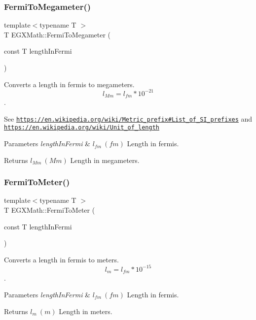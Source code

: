 \subsubsection{\texorpdfstring{Fermi\+To\+Megameter()}{FermiToMegameter()}}
{\footnotesize\ttfamily template$<$typename T $>$ \\
T E\+G\+X\+Math\+::\+Fermi\+To\+Megameter (\begin{DoxyParamCaption}\item[{const T}]{length\+In\+Fermi }\end{DoxyParamCaption})}



Converts a length in fermis to megameters. \[ l_{Mm}=l_{fm} * 10^{-21} \]. 

See \href{https://en.wikipedia.org/wiki/Metric_prefix#List_of_SI_prefixes}{\tt https\+://en.\+wikipedia.\+org/wiki/\+Metric\+\_\+prefix\#\+List\+\_\+of\+\_\+\+S\+I\+\_\+prefixes} and \href{https://en.wikipedia.org/wiki/Unit_of_length}{\tt https\+://en.\+wikipedia.\+org/wiki/\+Unit\+\_\+of\+\_\+length} 
\begin{DoxyParams}{Parameters}
{\em length\+In\+Fermi} & $ l_{fm}\ (fm)$ Length in fermis. \\
\hline
\end{DoxyParams}
\begin{DoxyReturn}{Returns}
$ l_{Mm}\ (Mm)$ Length in megameters. 
\end{DoxyReturn}
\mbox{\label{group___e_g_x_math-_conversions-_length_conversions-_non-_s_i-_fermi-_s_i_ga4b46bec209c12abbb998b2301d273d28}} 
\subsubsection{\texorpdfstring{Fermi\+To\+Meter()}{FermiToMeter()}}
{\footnotesize\ttfamily template$<$typename T $>$ \\
T E\+G\+X\+Math\+::\+Fermi\+To\+Meter (\begin{DoxyParamCaption}\item[{const T}]{length\+In\+Fermi }\end{DoxyParamCaption})}



Converts a length in fermis to meters. \[ l_{m}=l_{fm} * 10^{-15} \]. 


\begin{DoxyParams}{Parameters}
{\em length\+In\+Fermi} & $ l_{fm}\ (fm)$ Length in fermis. \\
\hline
\end{DoxyParams}
\begin{DoxyReturn}{Returns}
$ l_{m}\ (m)$ Length in meters. 
\end{DoxyReturn}
\mbox{\label{group___e_g_x_math-_conversions-_length_conversions-_non-_s_i-_fermi-_s_i_ga3e8b4a4bff215efda3d05329d6a823db}} 

